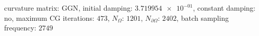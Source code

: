 curvature matrix: $\text{GGN}$, initial damping: $\num[scientific-notation=true]{3.719954e-01}$, constant damping: $\text{no}$, maximum CG iterations: $\num[scientific-notation=false]{473}$, $N_{\Omega}$: $\num[scientific-notation=false]{1201}$, $N_{\partial\Omega}$: $\num[scientific-notation=false]{2402}$, batch sampling frequency: $\num[scientific-notation=false]{2749}$